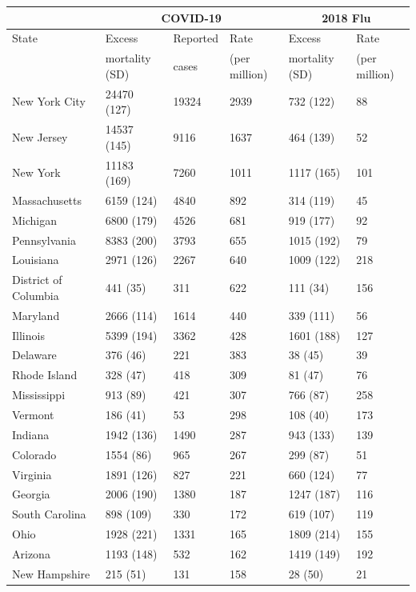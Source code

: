 \documentclass[11pt]{article}
\begin{document}
\begin{table}
\centering
\tiny
\begin{tabular}{|l|lll|ll|}
  \hline
 & \multicolumn{3}{c|}{COVID-19} & \multicolumn{2}{c|}{2018 Flu} \\
\hline
State & Excess & Reported & Rate  & Excess & Rate \\
 & mortality (SD) & cases & (per million) & mortality (SD) & (per million) \\
\hline
New York City & 24470 (127) & 19324 & 2939 & 732 (122) & 88 \\ 
  New Jersey & 14537 (145) & 9116 & 1637 & 464 (139) & 52 \\ 
  New York& 11183 (169) & 7260 & 1011 & 1117 (165) & 101 \\ 
  Massachusetts & 6159 (124) & 4840 & 892 & 314 (119) & 45 \\ 
  Michigan & 6800 (179) & 4526 & 681 & 919 (177) & 92 \\ 
  Pennsylvania & 8383 (200) & 3793 & 655 & 1015 (192) & 79 \\ 
  Louisiana & 2971 (126) & 2267 & 640 & 1009 (122) & 218 \\ 
  District of Columbia & 441 (35) & 311 & 622 & 111 (34) & 156 \\ 
  Maryland & 2666 (114) & 1614 & 440 & 339 (111) & 56 \\ 
  Illinois & 5399 (194) & 3362 & 428 & 1601 (188) & 127 \\ 
  Delaware & 376 (46) & 221 & 383 & 38 (45) & 39 \\ 
  Rhode Island & 328 (47) & 418 & 309 & 81 (47) & 76 \\ 
  Mississippi & 913 (89) & 421 & 307 & 766 (87) & 258 \\ 
  Vermont & 186 (41) & 53 & 298 & 108 (40) & 173 \\ 
  Indiana & 1942 (136) & 1490 & 287 & 943 (133) & 139 \\ 
  Colorado & 1554 (86) & 965 & 267 & 299 (87) & 51 \\ 
  Virginia & 1891 (126) & 827 & 221 & 660 (124) & 77 \\ 
  Georgia & 2006 (190) & 1380 & 187 & 1247 (187) & 116 \\ 
  South Carolina & 898 (109) & 330 & 172 & 619 (107) & 119 \\ 
  Ohio & 1928 (221) & 1331 & 165 & 1809 (214) & 155 \\ 
  Arizona & 1193 (148) & 532 & 162 & 1419 (149) & 192 \\ 
  New Hampshire & 215 (51) & 131 & 158 & 28 (50) & 21 \\ 

\end{tabular}
\end{table}
\end{document}
